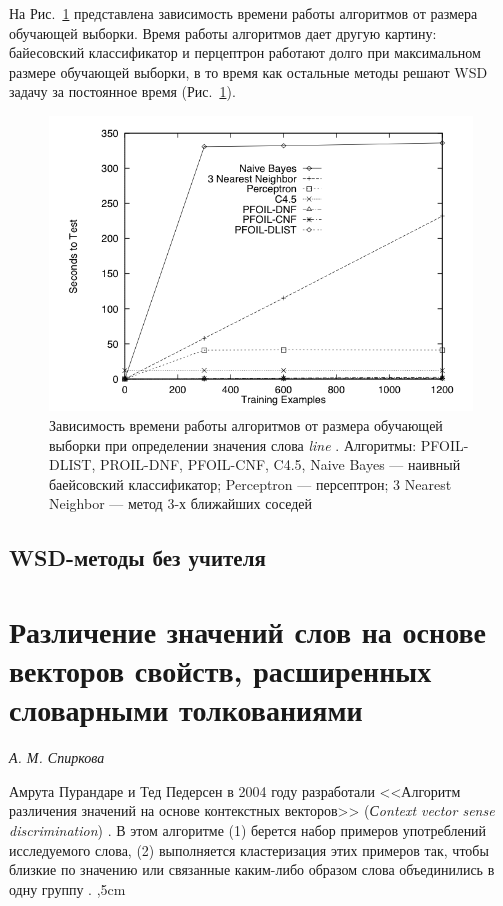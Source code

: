 \documentclass{article}
\begin{document}
\begin{articletext}
На Рис.~\ref{kor3} представлена зависимость времени работы алгоритмов от размера обучающей выборки. Время работы алгоритмов дает другую картину: байесовский классификатор и перцептрон работают долго при максимальном размере обучающей выборки, в то время как остальные методы решают WSD задачу за постоянное время (Рис.~\ref{kor3}). 

\begin{figure}[H]
\includegraphics[keepaspectratio=true,
 width=0.9\columnwidth]{line_wsd_3_testing_time.png}
\caption{Зависимость времени работы алгоритмов от размера обучающей выборки при определении значения слова \textit{line} \cite{Mooney 1996}. Алгоритмы: PFOIL-DLIST, PROIL-DNF, PFOIL-CNF, C4.5, Naive Bayes --- наивный баейсовский классификатор; Perceptron --- персептрон; 3 Nearest Neighbor --- метод 3-х ближайших соседей}
\label{kor3}
\end{figure}

\bfullwidth
\begin{center}
\section{WSD-методы без учителя}
\end{center}
\efullwidth


\section{Различение значений слов на основе векторов свойств, расширенных словарными толкованиями}

\begin{flushright}
\textit{А. М. Спиркова} 
\end{flushright}

Амрута Пурандаре и Тед Педерсен в 2004 году разработали <<Алгоритм различения значений на основе контекстных векторов>> (\textit{Сontext vector sense discrimination}) \cite{Purandare 2004}. В этом алгоритме (1) берется набор примеров употреблений исследуемого слова, (2) выполняется кластеризация этих примеров так, чтобы близкие по значению или связанные каким-либо образом слова объединились в одну группу \cite{Purandare 2004}.
,5cm


\end{articletext}
\end{document}
